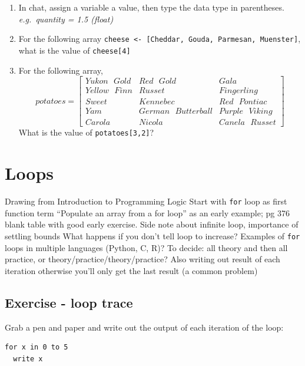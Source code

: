 \documentclass[
]{book}
\providecommand{\tightlist}{%
  \setlength{\itemsep}{0pt}\setlength{\parskip}{0pt}}
\begin{document}
\begin{enumerate}
\def\labelenumi{\arabic{enumi}.}
\tightlist
\item
  In chat, assign a variable a value, then type the data type in parentheses. \emph{e.g.~quantity = 1.5 (float)}
\item
  For the following array \texttt{cheese\ \textless{}-\ {[}Cheddar,\ Gouda,\ Parmesan,\ Muenster{]}}, what is the value of \texttt{cheese{[}4{]}}
\item
  For the following array, \begin{equation}
  potatoes =
  \begin{bmatrix}
  Yukon\text{ }Gold & Red\text{ }Gold & Gala \\
  Yellow\text{ }Finn & Russet & Fingerling \\
  Sweet & Kennebec & Red\text{ }Pontiac \\
  Yam & German\text{ }Butterball & Purple\text{ }Viking \\
  Carola & Nicola & Canela\text{ }Russet
  \end{bmatrix}
  \end{equation}What is the value of \texttt{potatoes{[}3,2{]}}?
\end{enumerate}

\chapter{Loops}\label{loops}

Drawing from Introduction to Programming Logic\citep{lynne_ohanlon_introduction_2000}
Start with \texttt{for} loop as first function term
``Populate an array from a for loop'' as an early example; pg 376 blank table with good early exercise.
Side note about infinite loop, importance of settling bounds
What happens if you don't tell loop to increase?
Examples of \texttt{for} loops in multiple languages (Python, C, R)?
To decide: all theory and then all practice, or theory/practice/theory/practice?
Also writing out result of each iteration otherwise you'll only get the last result (a common problem)

\section{Exercise - loop trace}\label{exercise---loop-trace}

Grab a pen and paper and write out the output of each iteration of the loop:

\begin{verbatim}
for x in 0 to 5 
  write x
  
\end{verbatim}
\end{document}
